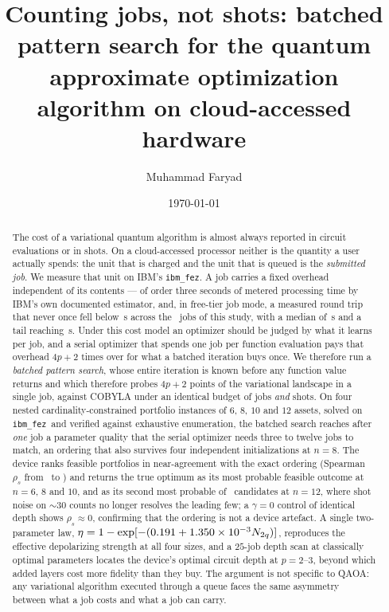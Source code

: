 \documentclass[aps,prx,preprint,superscriptaddress,nofootinbib,longbibliography]{revtex4-2}
\newcommand{\ibmfez}{\texttt{ibm\_fez}}
\newcommand{\Ntwoq}{N_{2q}}
\begin{document}
\title{Counting jobs, not shots: batched pattern search for the quantum
approximate optimization algorithm on cloud-accessed hardware}

\author{Muhammad Faryad}

\date{\today}

\begin{abstract}
The cost of a variational quantum algorithm is almost always reported in circuit
evaluations or in shots. On a cloud-accessed processor neither is the quantity a user
actually spends: the unit that is charged and the unit that is queued is the
\emph{submitted job}. We measure that unit on IBM's \ibmfez. A job carries a fixed
overhead independent of its contents --- of order three seconds of metered processing time by
IBM's own documented estimator, and, in free-tier job mode, a measured round trip that never
once fell below \minwall\,s across the \alljobs\ jobs of this study, with a median of
\medianwall\,s and a tail reaching \maxwall\,s. Under this cost model an optimizer should be
judged by what it learns per job, and a serial optimizer that spends one job per function
evaluation pays that overhead $4p+2$ times over for what a batched iteration buys once. We therefore run a \emph{batched pattern search}, whose
entire iteration is known before any function value returns and which therefore probes
$4p+2$ points of the variational landscape in a single job, against COBYLA under an
identical budget of jobs \emph{and} shots. On four nested cardinality-constrained portfolio
instances of $6$, $8$, $10$ and $12$ assets, solved on \ibmfez\ and verified against exhaustive
enumeration, the batched search reaches after \emph{one} job a parameter quality that the
serial optimizer needs three to twelve jobs to match, an ordering that also survives four
independent initializations at $n=8$. The device ranks feasible portfolios in near-agreement with the exact ordering
(Spearman $\rho_s$ from \rhosix\ to \rhotwelve) and returns the true optimum as its most
probable feasible outcome at $n=6$, $8$ and $10$, and as its second most probable of
\nfeastwelve\ candidates at $n=12$, where shot noise on $\sim\!30$ counts no longer resolves
the leading few; a $\gamma=0$ control of identical depth shows
$\rho_s\approx0$, confirming that the ordering is not a device artefact. A single
two-parameter law, $\eta = 1-\exp[-(\etaa + \etab\times10^{-3}\Ntwoq)]$, reproduces the
effective depolarizing strength at all four sizes, and a $25$-job depth scan at classically
optimal parameters locates the device's optimal circuit depth at $p = 2$--$3$, beyond which
added layers cost more fidelity than they buy. The argument is not specific to QAOA: any
variational algorithm executed through a queue faces the same asymmetry between what a job
costs and what a job can carry.
\end{abstract}
\end{document}
